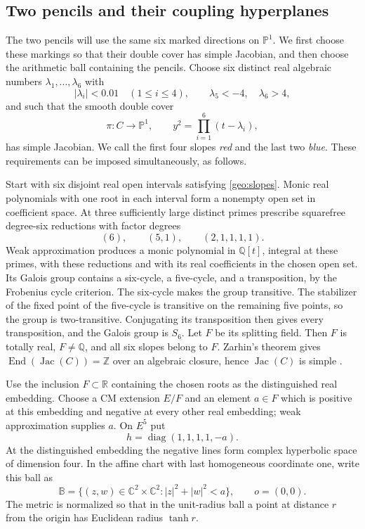 \documentclass[11pt,reqno]{amsart}
\numberwithin{equation}{section}
\theoremstyle{definition}
\theoremstyle{remark}
\newcommand{\C}{\mathbb C}
\newcommand{\R}{\mathbb R}
\newcommand{\Q}{\mathbb Q}
\newcommand{\Z}{\mathbb Z}
\newcommand{\BB}{\mathbb B}
\newcommand{\PP}{\mathbb P}
\DeclareMathOperator{\Jac}{Jac}
\DeclareMathOperator{\End}{End}
\begin{document}
\subsection{Two pencils and their coupling hyperplanes}\label{geo:prototype}

The two pencils will use the same six marked directions on $\PP^1$.
We first choose these markings so that their double cover has simple
Jacobian, and then choose the arithmetic ball containing the pencils.
Choose six distinct real algebraic numbers $\lambda_1,\ldots,\lambda_6$ with
\begin{equation}\label{geo:slopes}
 |\lambda_i|<0.01\quad(1\le i\le4),
 \qquad \lambda_5<-4,\quad \lambda_6>4,
\end{equation}
and such that the smooth double cover
\begin{equation}\label{geo:curve}
 \pi:C\longrightarrow\PP^1,
 \qquad y^2=\prod_{i=1}^6(t-\lambda_i),
\end{equation}
has simple Jacobian.  We call the first four slopes \emph{red} and the
last two \emph{blue}.  These requirements can be imposed simultaneously,
as follows.

Start with six disjoint real open intervals satisfying
\eqref{geo:slopes}.  Monic real polynomials with one root in each interval
form a nonempty open set in coefficient space.  At three sufficiently
large distinct primes prescribe squarefree degree-six reductions with
factor degrees
\[
 (6),\qquad(5,1),\qquad(2,1,1,1,1).
\]
Weak approximation produces a monic polynomial in $\Q[t]$, integral at
these primes, with these reductions and with its real coefficients in
the chosen open set.  Its Galois group contains a six-cycle, a five-cycle,
and a transposition, by the Frobenius cycle criterion.  The six-cycle
makes the group transitive.  The stabilizer of the fixed point of the
five-cycle is transitive on the remaining five points, so the group is
two-transitive.  Conjugating its transposition then gives every
transposition, and the Galois group is $S_6$.  Let $F$ be its splitting
field.  Then $F$ is totally real, $F\ne\Q$, and all six slopes belong
to $F$.  Zarhin's theorem gives
$\End(\Jac(C))=\Z$ over an algebraic closure, hence $\Jac(C)$ is simple
\cite[Theorem~2.1]{Zarhin}.

Use the inclusion $F\subset\R$ containing the chosen roots as the
distinguished real embedding.  Choose a CM extension $E/F$ and an
element $a\in F$ which is positive at this embedding and negative at
every other real embedding; weak approximation supplies $a$.  On $E^5$ put
\begin{equation}\label{geo:hermitian}
 h=\operatorname{diag}(1,1,1,1,-a).
\end{equation}
At the distinguished embedding the negative lines form complex
hyperbolic space of dimension four.  In the affine chart with last
homogeneous coordinate one, write this ball as
\[
 \BB=\{(z,w)\in\C^2\times\C^2:|z|^2+|w|^2<a\},
 \qquad o=(0,0).
\]
The metric is normalized so that in the unit-radius ball a point at
distance $r$ from the origin has Euclidean radius $\tanh r$.
\end{document}
